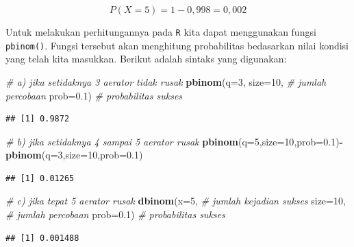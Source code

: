 \documentclass[]{book}
\newenvironment{Shaded}{\begin{snugshade}}{\end{snugshade}}
\newcommand{\KeywordTok}[1]{\textcolor[rgb]{0.13,0.29,0.53}{\textbf{#1}}}
\newcommand{\DataTypeTok}[1]{\textcolor[rgb]{0.13,0.29,0.53}{#1}}
\newcommand{\DecValTok}[1]{\textcolor[rgb]{0.00,0.00,0.81}{#1}}
\newcommand{\FloatTok}[1]{\textcolor[rgb]{0.00,0.00,0.81}{#1}}
\newcommand{\CommentTok}[1]{\textcolor[rgb]{0.56,0.35,0.01}{\textit{#1}}}
\newcommand{\OperatorTok}[1]{\textcolor[rgb]{0.81,0.36,0.00}{\textbf{#1}}}
\newcommand{\NormalTok}[1]{#1}
\begin{document}
\[
P\left(X=5\right)=1-0,998=0,002
\]

Untuk melakukan perhitungannya pada \texttt{R} kita dapat menggunakan
fungsi \texttt{pbinom()}. Fungsi tersebut akan menghitung probabilitas
bedasarkan nilai kondisi yang telah kita masukkan. Berikut adalah
sintaks yang digunakan:

\begin{Shaded}
\begin{Highlighting}[]
\CommentTok{# a) jika setidaknya 3 aerator tidak rusak}
\KeywordTok{pbinom}\NormalTok{(}\DataTypeTok{q=}\DecValTok{3}\NormalTok{,  }
       \DataTypeTok{size=}\DecValTok{10}\NormalTok{, }\CommentTok{# jumlah percobaan}
       \DataTypeTok{prob=}\FloatTok{0.1}\NormalTok{) }\CommentTok{# probabilitas sukses}
\end{Highlighting}
\end{Shaded}

\begin{verbatim}
## [1] 0.9872
\end{verbatim}

\begin{Shaded}
\begin{Highlighting}[]
\CommentTok{# b) jika setidaknya 4 sampai 5 aerator rusak}
\KeywordTok{pbinom}\NormalTok{(}\DataTypeTok{q=}\DecValTok{5}\NormalTok{,}\DataTypeTok{size=}\DecValTok{10}\NormalTok{,}\DataTypeTok{prob=}\FloatTok{0.1}\NormalTok{)}\OperatorTok{-}\KeywordTok{pbinom}\NormalTok{(}\DataTypeTok{q=}\DecValTok{3}\NormalTok{,}\DataTypeTok{size=}\DecValTok{10}\NormalTok{,}\DataTypeTok{prob=}\FloatTok{0.1}\NormalTok{) }
\end{Highlighting}
\end{Shaded}

\begin{verbatim}
## [1] 0.01265
\end{verbatim}

\begin{Shaded}
\begin{Highlighting}[]
\CommentTok{# c) jika tepat 5 aerator rusak}
\KeywordTok{dbinom}\NormalTok{(}\DataTypeTok{x=}\DecValTok{5}\NormalTok{, }\CommentTok{# jumlah kejadian sukses}
       \DataTypeTok{size=}\DecValTok{10}\NormalTok{, }\CommentTok{# jumlah percobaan}
       \DataTypeTok{prob=}\FloatTok{0.1}\NormalTok{) }\CommentTok{# probabilitas sukses}
\end{Highlighting}
\end{Shaded}

\begin{verbatim}
## [1] 0.001488
\end{verbatim}
\end{document}
